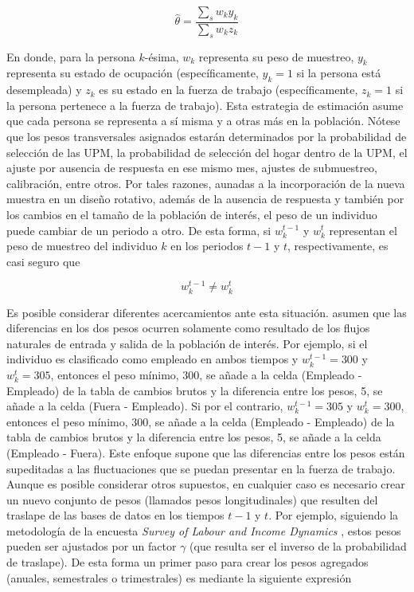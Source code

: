 \documentclass[
  10pt,
  spanish,
]{book}
\begin{document}
\[\hat\theta=\frac{\sum_s w_ky_k}{\sum_s w_kz_k}\]

En donde, para la persona \(k\)-ésima, \(w_k\) representa su peso de
muestreo, \(y_k\) representa su estado de ocupación (específicamente,
\(y_k=1\) si la persona está desempleada) y \(z_k\) es su estado en la
fuerza de trabajo (específicamente, \(z_k=1\) si la persona pertenece a la
fuerza de trabajo). Esta estrategia de estimación asume que cada persona
se representa a sí misma y a otras más en la población. Nótese que los
pesos transversales asignados estarán determinados por la probabilidad
de selección de las UPM, la probabilidad de selección del hogar dentro
de la UPM, el ajuste por ausencia de respuesta en ese mismo mes, ajustes
de submuestreo, calibración, entre otros. Por tales razones, aunadas a
la incorporación de la nueva muestra en un diseño rotativo, además de la
ausencia de respuesta y también por los cambios en el tamaño de la
población de interés, el peso de un individuo puede cambiar de un
periodo a otro. De esta forma, si \(w_k^{t-1}\) y \(w_k^{t}\) representan el
peso de muestreo del individuo \(k\) en los periodos \(t-1\) y \(t\),
respectivamente, es casi seguro que

\[w_k^{t-1} \neq w_k^t\]

Es posible considerar diferentes acercamientos ante esta situación.
\citet{Feinberg_Stasny_1983} asumen que las diferencias en los dos pesos
ocurren solamente como resultado de los flujos naturales de entrada y
salida de la población de interés. Por ejemplo, si el individuo es
clasificado como empleado en ambos tiempos y \(w_k^{t-1}=300\) y
\(w_k^{t}=305\), entonces el peso mínimo, 300, se añade a la celda
(Empleado - Empleado) de la tabla de cambios brutos y la diferencia
entre los pesos, 5, se añade a la celda (Fuera - Empleado). Si por el
contrario, \(w_k^{t-1}=305\) y \(w_k^{t}=300\), entonces el peso mínimo,
300, se añade a la celda (Empleado - Empleado) de la tabla de cambios
brutos y la diferencia entre los pesos, 5, se añade a la celda (Empleado
- Fuera). Este enfoque supone que las diferencias entre los pesos están
supeditadas a las fluctuaciones que se puedan presentar en la fuerza de
trabajo. Aunque es posible considerar otros supuestos, en cualquier caso
es necesario crear un nuevo conjunto de pesos (llamados pesos
longitudinales) que resulten del traslape de las bases de datos en los
tiempos \(t-1\) y \(t\). Por ejemplo, siguiendo la metodología de la
encuesta \emph{Survey of Labour and Income Dynamics} \citep{Naud_2002, LaRoche_2003}, estos pesos pueden ser ajustados por un factor \(\gamma\)
(que resulta ser el inverso de la probabilidad de traslape). De esta
forma un primer paso para crear los pesos agregados (anuales,
semestrales o trimestrales) es mediante la siguiente expresión
\end{document}
